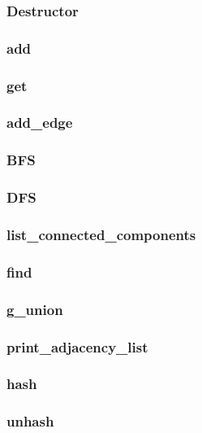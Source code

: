 \documentclass[a4paper,11pt]{article}
\begin{document}
    \subsubsection{Destructor}

    \subsubsection{add}

    \subsubsection{get}

    \subsubsection{add\_edge}

    \subsubsection{BFS}

    \subsubsection{DFS}
    
    \subsubsection{list\_connected\_components}
    
    \subsubsection{find}
    
    \subsubsection{g\_union}
    
    \subsubsection{print\_adjacency\_list}
    
    \subsubsection{hash}
    
    \subsubsection{unhash}
\end{document}
